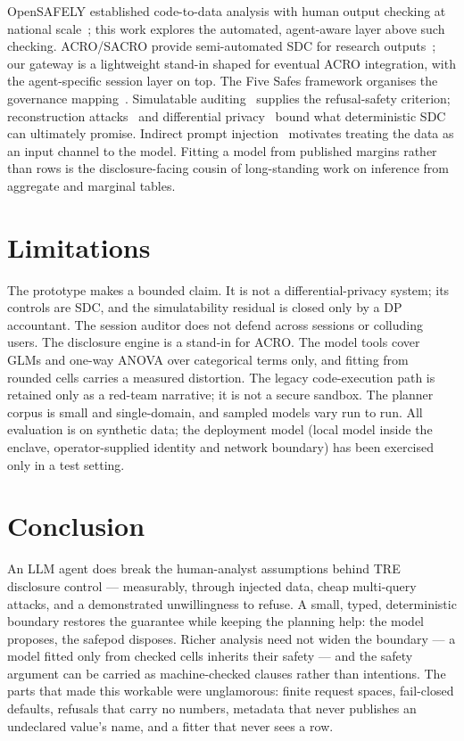 \documentclass[11pt,a4paper]{article}
\begin{document}
OpenSAFELY established code-to-data analysis with human output checking at
national scale~\cite{opensafely2020}; this work explores the automated,
agent-aware layer above such checking. ACRO/SACRO provide semi-automated SDC
for research outputs~\cite{acro}; our gateway is a lightweight stand-in shaped
for eventual ACRO integration, with the agent-specific session layer on top.
The Five Safes framework organises the governance mapping~\cite{fivesafes}.
Simulatable auditing~\cite{kenthapadi2005} supplies the refusal-safety
criterion; reconstruction attacks~\cite{dinur2003} and differential
privacy~\cite{dwork2006} bound what deterministic SDC can ultimately promise.
Indirect prompt injection~\cite{greshake2023} motivates treating the data as
an input channel to the model. Fitting a model from published margins rather
than rows is the disclosure-facing cousin of long-standing work on inference
from aggregate and marginal tables.

\section{Limitations}

The prototype makes a bounded claim. It is not a differential-privacy system;
its controls are SDC, and the simulatability residual is closed only by a DP
accountant. The session auditor does not defend across sessions or colluding
users. The disclosure engine is a stand-in for ACRO. The model tools cover
GLMs and one-way ANOVA over categorical terms only, and fitting from rounded
cells carries a measured distortion. The legacy code-execution path is retained
only as a red-team narrative; it is not a secure sandbox. The planner corpus is
small and single-domain, and sampled models vary run to run. All evaluation is
on synthetic data; the deployment model (local model inside the enclave,
operator-supplied identity and network boundary) has been exercised only in a
test setting.

\section{Conclusion}

An LLM agent does break the human-analyst assumptions behind TRE disclosure
control --- measurably, through injected data, cheap multi-query attacks, and
a demonstrated unwillingness to refuse. A small, typed, deterministic boundary
restores the guarantee while keeping the planning help: the model proposes,
the safepod disposes. Richer analysis need not widen the boundary --- a model
fitted only from checked cells inherits their safety --- and the safety argument
can be carried as machine-checked clauses rather than intentions. The parts that
made this workable were unglamorous: finite request spaces, fail-closed
defaults, refusals that carry no numbers, metadata that never publishes an
undeclared value's name, and a fitter that never sees a row.
\end{document}
